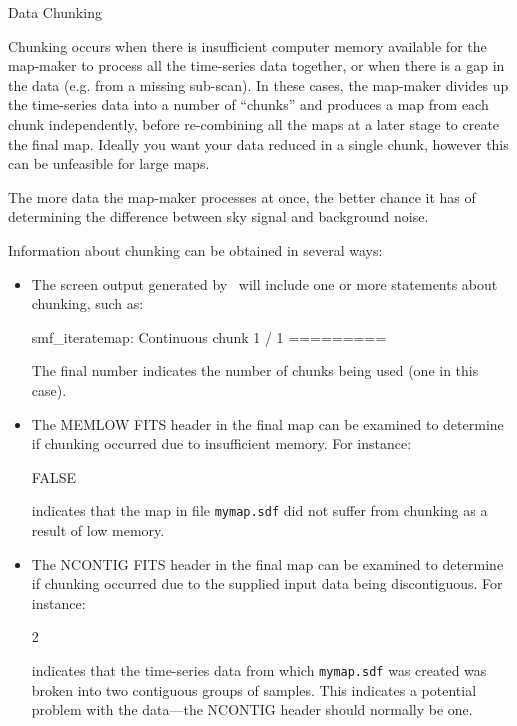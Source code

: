 \raggedbottom

\begin{sltextbox}{Data Chunking}
  \renewcommand\figurename{Data Chunking}
  \renewcommand{\thefigure}{}
  \renewcommand{\thefigure}{}
  \caption{}
  \label{box:chunk}
  Chunking occurs when there is insufficient computer memory available
  for the map-maker to process all the time-series data together, or when
  there is a gap in the data (e.g.  from a missing sub-scan). In these
  cases, the map-maker divides up the time-series data into a number of
  ``chunks'' and produces a map from each chunk independently, before
  re-combining all the maps at a later stage to create the final map.
  Ideally you want your data reduced in a single chunk, however this can
  be unfeasible for large maps.

  The more data the map-maker processes at once, the better chance it
  has of determining the difference between sky signal and background
  noise.

  Information about chunking can be obtained in several ways:
  \begin{itemize}

  \item The screen output generated by \makemap\ will include one or more
  statements about chunking, such as:
  \begin{terminalv}
smf_iteratemap: Continuous chunk 1 / 1 =========
  \end{terminalv}
  The final number indicates the number of chunks being used (one in
  this case).

  \item The MEMLOW FITS header in the final map can be examined to
  determine if chunking occurred due to insufficient memory. For
  instance:
  \begin{terminalv}
FALSE
  \end{terminalv}
  indicates that the map in file \texttt{mymap.sdf} did not suffer from
  chunking as a result of low memory.

  \item The NCONTIG FITS header in the final map can be examined to
  determine if chunking occurred due to the supplied input data being
  discontiguous. For instance:
  \begin{terminalv}
2
  \end{terminalv}
  indicates that the time-series data from which \texttt{mymap.sdf} was
  created was broken into two contiguous groups of samples. This
  indicates a potential problem with the data---the NCONTIG header
  should normally be one.
  \end{itemize}


\end{sltextbox}
